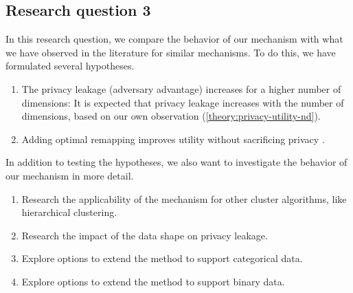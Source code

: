 \subsection{Research question 3}
In this research question, we compare the behavior of our mechanism with what we have observed in the literature for similar mechanisms.
To do this, we have formulated several hypotheses.
\begin{enumerate}
  \item The privacy leakage (adversary advantage) increases for a higher number of dimensions:
        It is expected that privacy leakage increases with the number of dimensions, based on our own observation (\ref{theory:privacy-utility-nd}).
  \item Adding optimal remapping improves utility without sacrificing privacy .
\end{enumerate}
In addition to testing the hypotheses, we also want to investigate the behavior of our mechanism in more detail.
\begin{enumerate}
  \item Research the applicability of the mechanism for other cluster algorithms, like hierarchical clustering.
  \item Research the impact of the data shape on privacy leakage.
  \item Explore options to extend the method to support categorical data.
  \item Explore options to extend the method to support binary data.
\end{enumerate}
